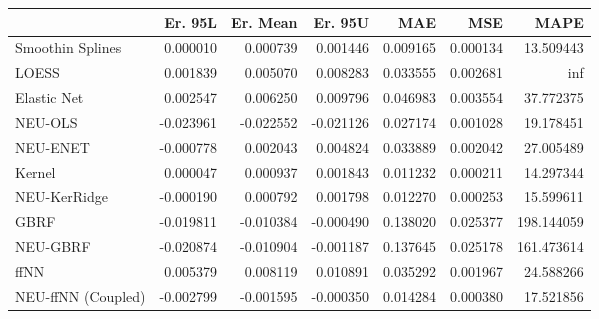 \begin{tabular}{lrrrrrr}
\toprule
{} &   Er. 95L &  Er. Mean &   Er. 95U &       MAE &       MSE &        MAPE \\
\midrule
Smoothin Splines   &  0.000010 &  0.000739 &  0.001446 &  0.009165 &  0.000134 &   13.509443 \\
LOESS              &  0.001839 &  0.005070 &  0.008283 &  0.033555 &  0.002681 &         inf \\
Elastic Net        &  0.002547 &  0.006250 &  0.009796 &  0.046983 &  0.003554 &   37.772375 \\
NEU-OLS            & -0.023961 & -0.022552 & -0.021126 &  0.027174 &  0.001028 &   19.178451 \\
NEU-ENET           & -0.000778 &  0.002043 &  0.004824 &  0.033889 &  0.002042 &   27.005489 \\
Kernel             &  0.000047 &  0.000937 &  0.001843 &  0.011232 &  0.000211 &   14.297344 \\
NEU-KerRidge       & -0.000190 &  0.000792 &  0.001798 &  0.012270 &  0.000253 &   15.599611 \\
GBRF               & -0.019811 & -0.010384 & -0.000490 &  0.138020 &  0.025377 &  198.144059 \\
NEU-GBRF           & -0.020874 & -0.010904 & -0.001187 &  0.137645 &  0.025178 &  161.473614 \\
ffNN               &  0.005379 &  0.008119 &  0.010891 &  0.035292 &  0.001967 &   24.588266 \\
NEU-ffNN (Coupled) & -0.002799 & -0.001595 & -0.000350 &  0.014284 &  0.000380 &   17.521856 \\
\bottomrule
\end{tabular}
